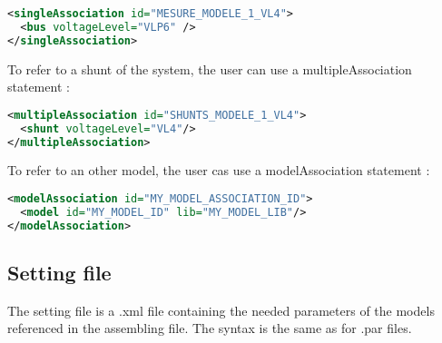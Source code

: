 \documentclass[a4paper, 12pt]{report}
\begin{document}
\begin{lstlisting}[language=XML, morekeywords={singleAssociation}]
<singleAssociation id="MESURE_MODELE_1_VL4">
  <bus voltageLevel="VLP6" />
</singleAssociation>
\end{lstlisting}

To refer to a shunt of the system, the user can use a multipleAssociation statement :

\begin{lstlisting}[language=XML, morekeywords={multipleAssociation}]
<multipleAssociation id="SHUNTS_MODELE_1_VL4">
  <shunt voltageLevel="VL4"/>
</multipleAssociation>
\end{lstlisting}

To refer to an other model, the user cas use a modelAssociation statement :

\begin{lstlisting}[language=XML, morekeywords={modelAssociation}]
<modelAssociation id="MY_MODEL_ASSOCIATION_ID">
  <model id="MY_MODEL_ID" lib="MY_MODEL_LIB"/>
</modelAssociation>
\end{lstlisting}

\subsection{Setting file}

The setting file is a .xml file containing the needed parameters of the models referenced in the assembling file. The syntax is the same as for .par files.
\end{document}
